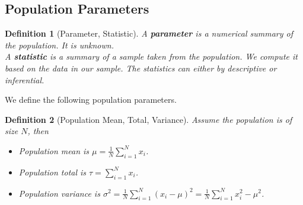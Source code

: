 \documentclass[12pt]{article}
\newtheorem{definition}{Definition}[section]
\theoremstyle{definition}
\begin{document}
\subsection{Population Parameters}
\begin{definition}[Parameter, Statistic]
\normalfont A \textbf{parameter} is a numerical summary of the population. It is unknown.\\
A \textbf{statistic} is a summary of a sample taken from the population. We compute it based on the data in our sample. The statistics can either by descriptive or inferential.
\end{definition}
We define the following population parameters.
\begin{definition}[Population Mean, Total, Variance]
\normalfont Assume the population is of size $N$, then
\begin{itemize}
  \item Population mean is $\mu=\frac{1}{N}\sum_{i=1}^N x_i$.
  \item Population total is $\tau = \sum_{i=1}^N x_i$.
  \item Population variance is $\sigma^2 = \frac{1}{N}\sum_{i=1}^N (x_i-\mu)^2 = \frac{1}{N}\sum_{i=1}^N x_i^2 - \mu^2$.
\end{itemize}
\end{definition} 
\end{document}
